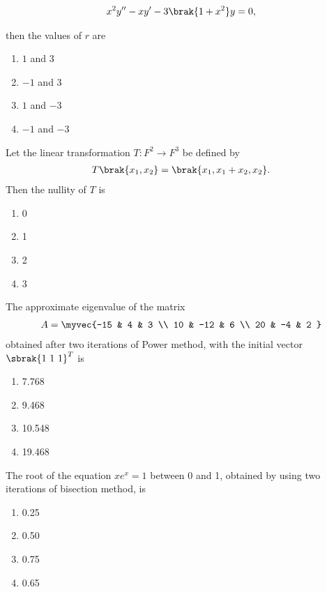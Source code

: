 	\begin{align*} x^2 y^{\prime \prime} - xy^{\prime} - 3 \brak{1 + x^2} y = 0,
	\end{align*}

then the values of $r$ are \begin{enumerate}
    \item $1$ and $3$ \item $-1$ and $3$ \item $1$ and $-3$ \item $-1$ and $-3$
\end{enumerate} \item Let the linear transformation $T : F^2 \rightarrow F^3$ be defined by \begin{align*} T \brak{x_1, x_2} = \brak{x_1, x_1 + x_2, x_2}. \end{align*} Then the 
nullity of $T$ is

\begin{enumerate} \item 0 \item 1 \item 2 \item 3
\end{enumerate}

\item The approximate eigenvalue of the matrix \begin{align*}
	A = \myvec{-15 & 4 & 3 \\
                   10 & -12 & 6 \\ 20 & -4 & 2 }
\end{align*} obtained after two iterations of Power method, with the initial vector $\sbrak{1 \ 1 \ 1}^T$ is

\begin{enumerate} \item 7.768 \item 9.468 \item 10.548 \item 19.468
\end{enumerate} \item The root of the equation $x e^x = 1$ between 0 and 1, obtained by using two iterations of bisection method, is \begin{enumerate}
    \item 0.25 \item 0.50 \item 0.75 \item 0.65
\end{enumerate}

